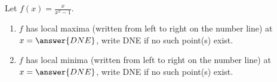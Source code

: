\documentclass{ximera}
\author{Gregory Hartman \and Matthew Carr}
\begin{document}
\begin{exercise}






Let $f(x)=\frac{x}{x^2-1}$.
\begin{enumerate}
\item		$f$ has local maxima (written from left to right on the number line) at $x=\answer{DNE}$, write DNE if no such point(s) exist.
\item		$f$ has local minima (written from left to right on the number line) at $x=\answer{DNE}$, write DNE if no such point(s) exist.
\end{enumerate}

\end{exercise}
\end{document}

